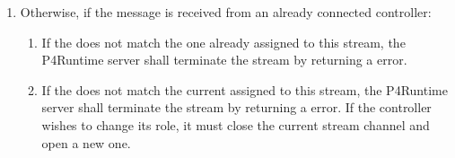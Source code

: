 \documentclass[11pt]{article}
\begin{document}
{\begin{enumerate}
\begin{enumerate}
\item{}
Otherwise, the controller is added to a list of connected controllers for
the given (, ) and the server remembers the
controllers ,  and  for this gRPC
channel. See below for the rules to determine if this controller becomes
a master or slave, and what notifications are sent as a consequence.%
\end{enumerate}%

\item{}
Otherwise, if the  message is received from an
already connected controller:%

\begin{enumerate}%

\item{}
If the  does not match the one already assigned to this
stream, the P4Runtime server shall terminate the stream by returning a
 error.%

\item{}
If the  does not match the current  assigned to this
stream, the P4Runtime server shall terminate the stream by returning a
 error. If the controller wishes to change its role,
it must close the current stream channel and open a new one.%


\end{enumerate}
\end{enumerate}}
\end{document}
